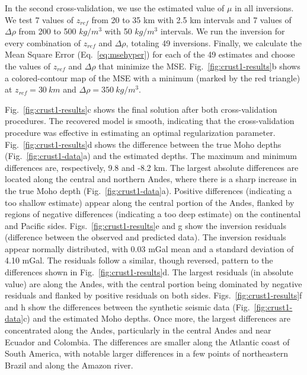 \documentclass[extra]{gji}
\begin{document}
In the second cross-validation,
we use the estimated value of $\mu$ in all inversions.
We test 7 values of $z_{ref}$ from 20 to 35 km with 2.5 km intervals
and 7 values of $\Delta\rho$ from 200 to 500 $kg/m^3$
with 50 $kg/m^3$ intervals.
We run the inversion for every combination of $z_{ref}$ and $\Delta\rho$,
totaling 49 inversions.
Finally, we calculate the Mean Square Error (Eq.~\ref{eq:msehyper})
for each of the 49 estimates
and choose the values of $z_{ref}$ and $\Delta\rho$ that minimize the MSE.
Fig.~\ref{fig:crust1-results}b
shows a colored-contour map of the MSE
with a minimum (marked by the red triangle)
at $z_{ref} = 30\ km$ and $\Delta\rho = 350\ kg/m^3$.

Fig.~\ref{fig:crust1-results}c shows the final solution after both
cross-validation procedures.
The recovered model is smooth, indicating that the cross-validation procedure
was effective in estimating an optimal regularization parameter.
Fig.~\ref{fig:crust1-results}d shows the difference between
the true Moho depths (Fig.~\ref{fig:crust1-data}a)
and the estimated depths.
The maximum and minimum differences are, respectively,
9.8 and -8.2 km.
The largest absolute differences are located along the central and northern
Andes, where there is a sharp increase in the true Moho depth
(Fig.~\ref{fig:crust1-data}a).
Positive differences (indicating a too shallow estimate)
appear along the central portion of the Andes,
flanked by regions of negative differences (indicating a too deep estimate)
on the continental and Pacific sides.
Figs.~\ref{fig:crust1-results}e and g show the inversion residuals (difference
between the observed and predicted data).
The inversion residuals appear normally distributed,
with 0.03 mGal mean and a standard deviation of 4.10 mGal.
The residuals follow a similar, though reversed, pattern
to the differences shown in Fig.~\ref{fig:crust1-results}d.
The largest residuals (in absolute value) are along the Andes,
with the central portion being dominated by negative residuals
and flanked by positive residuals on both sides.
Figs.~\ref{fig:crust1-results}f and h show the differences between
the synthetic seismic data (Fig.~\ref{fig:crust1-data}c)
and the estimated Moho depths.
Once more, the largest differences are concentrated along the Andes,
particularly in the central Andes and near Ecuador and Colombia.
The differences are smaller along the Atlantic coast of South America,
with notable larger differences in a few points of northeastern Brazil
and along the Amazon river.
\end{document}
